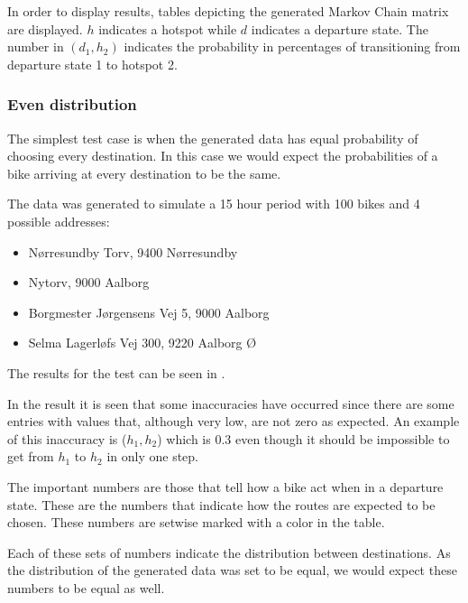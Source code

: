 In order to display results, tables depicting the generated Markov Chain matrix are displayed.
$h$ indicates a hotspot while $d$ indicates a departure state.
The number in $ (d_1,h_2) $ indicates the probability in percentages of transitioning from departure state 1 to hotspot 2. 

\subsubsection{Even distribution}
The simplest test case is when the generated data has equal probability of choosing every destination. 
In this case we would expect the probabilities of a bike arriving at every destination to be the same.

The data was generated to simulate a 15 hour period with 100 bikes and 4 possible addresses:
\begin{itemize}
\item Nørresundby Torv, 9400 Nørresundby
\item Nytorv, 9000 Aalborg
\item Borgmester Jørgensens Vej 5, 9000 Aalborg
\item Selma Lagerløfs Vej 300, 9220 Aalborg Ø
\end{itemize}
The results for the test can be seen in .

In the result it is seen that some inaccuracies have occurred since there are some entries with values that, although very low, are not zero as expected.
An example of this inaccuracy is ($ h_1, h_2 $) which is 0.3 even though it should be impossible to get from $ h_1 $ to $ h_2 $ in only one step.

The important numbers are those that tell how a bike act when in a departure state.
These are the numbers that indicate how the routes are expected to be chosen.
These numbers are setwise marked with a color in the table.

Each of these sets of numbers indicate the distribution between destinations.
As the distribution of the generated data was set to be equal, we would expect these numbers to be equal as well.

